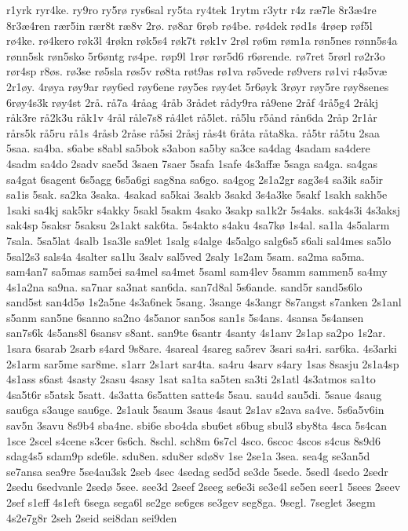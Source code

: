 {r1yrk
ryr4ke.
ry9ro
ry5rø
rys6sal
ry5ta
ry4tek
1rytm
r3ytr
r4z
ræ7le
8r3æ4re
8r3æ4ren
rær5in
rær8t
ræ8v
2rø.
rø8ar
6røb
rø4be.
rø4dek
rød1s
4røep
røf5l
rø4ke.
rø4kero
røk3l
4røkn
røk5s4
røk7t
røk1v
2røl
rø6m
røm1a
røn5nes
rønn5s4a
rønn5sk
røn5sko
5r6øntg
rø4pe.
røp9l
1rør
rør5d6
r6ørende.
rø7ret
5rørl
rø2r3o
rør4sp
r8øs.
rø3se
rø5sla
røs5v
rø8ta
røt9as
rø1va
rø5vede
rø9vers
rø1vi
r4ø5væ
2r1øy.
4røya
røy9ar
røy6ed
røy6ene
røy5es
røy4et
5r6øyk
3røyr
røy5re
røy8senes
6røy4s3k
røy4st
2rå.
rå7a
4råag
4råb
3rådet
rådy9ra
rå9ene
2råf
4rå5g4
2råkj
råk3re
rå2k3u
råk1v
4rål
råle7s8
rå4let
rå5let.
rå5lu
r5ånd
rån6da
2råp
2r1år
rårs5k
rå5ru
rå1s
4råsb
2råse
rå5si
2råsj
rås4t
6råta
råta8ka.
rå5tr
rå5tu
2saa
5saa.
sa4ba.
s6abe
s8abl
sa5bok
s3abon
sa5by
sa3ce
sa4dag
4sadam
sa4dere
4sadm
sa4do
2sadv
sae5d
3saen
7saer
5safa
1safe
4s3affæ
5saga
sa4ga.
sa4gas
sa4gat
6sagent
6s5agg
6s5a6gi
sag8na
sa6go.
sa4gog
2s1a2gr
sag3s4
sa3ik
sa5ir
sa1is
5sak.
sa2ka
3saka.
4sakad
sa5kai
3sakb
3sakd
3s4a3ke
5sakf
1sakh
sakh5e
1saki
sa4kj
sak5kr
s4akky
5sakl
5sakm
4sako
3sakp
sa1k2r
5s4aks.
sak4s3i
4s3aksj
sak4sp
5saksr
5saksu
2s1akt
sak6ta.
5s4akto
s4aku
4sa7kø
1s4al.
sa1la
4s5alarm
7sala.
5sa5lat
4salb
1sa3le
sa9let
1salg
s4alge
4s5algo
salg6s5
s6ali
sal4mes
sa5lo
5sal2s3
sals4a
4salter
sa1lu
3salv
sal5ved
2saly
1s2am
5sam.
sa2ma
sa5ma.
sam4an7
sa5mas
sam5ei
sa4mel
sa4met
5saml
sam4lev
5samm
sammen5
sa4my
4s1a2na
sa9na.
sa7nar
sa3nat
san6da.
san7d8al
5s6ande.
sand5r
sand5s6lo
sand5st
san4d5ø
1s2a5ne
4s3a6nek
5sang.
3sange
4s3angr
8s7angst
s7anken
2s1anl
s5anm
san5ne
6sanno
sa2no
4s5anor
san5os
san1s
5s4ans.
4sansa
5s4ansen
san7s6k
4s5ans8l
6sansv
s8ant.
san9te
6santr
4santy
4s1anv
2s1ap
sa2po
1s2ar.
1sara
6sarab
2sarb
s4ard
9s8are.
4sareal
4sareg
sa5rev
3sari
sa4ri.
sar6ka.
4s3arki
2s1arm
sar5me
sar8me.
s1arr
2s1art
sar4ta.
sa4ru
4sarv
s4ary
1sas
8sasju
2s1a4sp
4s1ass
s6ast
4sasty
2sasu
4sasy
1sat
sa1ta
sa5ten
sa3ti
2s1atl
4s3atmos
sa1to
4sa5t6r
s5atsk
5satt.
4s3atta
6s5atten
satte4s
5sau.
sau4d
sau5di.
5saue
4saug
sau6ga
s3auge
sau6ge.
2s1auk
5saum
3saus
4saut
2s1av
s2ava
sa4ve.
5s6a5v6in
sav5n
3savu
8s9b4
sba4ne.
sbi6e
sbo4da
sbu6et
s6bug
sbul3
sby8ta
4sca
5s4can
1sce
2scel
s4cene
s3cer
6s6ch.
8schl.
sch8m
6s7cl
4sco.
6scoc
4scos
s4cus
8s9d6
sdag4s5
sdam9p
sde6le.
sdu8en.
sdu8er
sdø8v
1se
2se1a
3sea.
sea4g
se3an5d
se7ansa
sea9re
5se4au3sk
2seb
4sec
4sedag
sed5d
se3de
5sede.
5sedl
4sedo
2sedr
2sedu
6sedvanle
2sedø
5see.
see3d
2seef
2seeg
se6e3i
se3e4l
se5en
seer1
5sees
2seev
2sef
s1eff
4s1eft
6sega
sega6l
se2ge
se6ges
se3gev
seg8ga.
9segl.
7seglet
3segm
4s2e7g8r
2seh
2seid
sei8dan
sei9den
}
